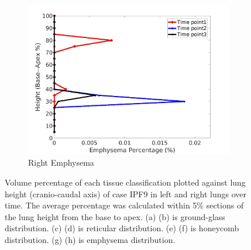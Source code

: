 \begin{figure}[H]
\begin{subfigure}{.42\linewidth}
  \includegraphics[width=\linewidth,trim={{.0\wd0} {.0\wd0} {.0\wd0} {.0\wd0}},clip]{Appendix/Image_AppexA/BaseToApex/IPF9RightLungEmphysemaDiseaseAgainstHeight.jpg}
  \caption{Right Emphysema}
  \label{fig:IPF9DiseaseAgainstHeight-h}
\end{subfigure}
\caption{Volume percentage of each tissue classification plotted against lung height (cranio-caudal axis) of case IPF9 in left and right lungs over time. The average percentage was calculated within 5\% sections of the lung height from the base to apex. (a) (b) is ground-glass distribution. (c) (d) is reticular distribution. (e) (f) is honeycomb distribution. (g) (h) is emphysema distribution.}
\label{fig:IPF9DiseaseAgainstHeight}
\end{figure}

